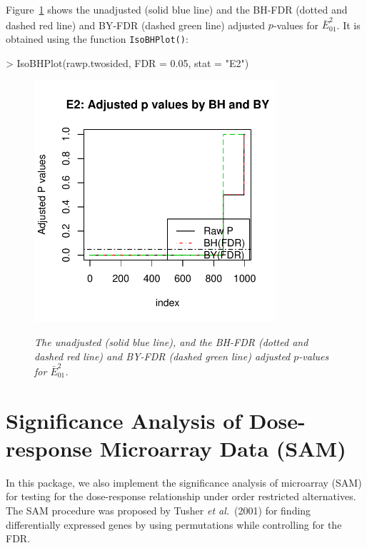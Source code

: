 \documentclass[10pt]{mybook4}
\begin{document}
Figure~\ref{IsoBHPlot} shows the unadjusted (solid blue line) and
the BH-FDR (dotted and dashed red line) and BY-FDR (dashed green
line) adjusted $p$-values for $\bar{E}^2_{01}$. It is obtained using
the function \texttt{IsoBHPlot()}:

\begin{Schunk}
\begin{Sinput}
> IsoBHPlot(rawp.twosided, FDR = 0.05, stat = "E2")
\end{Sinput}
\end{Schunk}


 
\begin{figure}[!h]
\centering
{\includegraphics[width=0.8\textwidth]{IsoGene-IsoBHPlot.pdf}}
\caption{\em {The unadjusted (solid blue line), and the BH-FDR
(dotted and dashed red line) and BY-FDR (dashed green line) adjusted
$p$-values for $\bar{E}_{01}^2$.}} \label{IsoBHPlot}
\end{figure}



\section{Significance Analysis of Dose-response Microarray Data (SAM)}

In this package, we also implement the significance analysis of microarray (SAM) for testing
for the dose-response relationship under order restricted alternatives. The SAM procedure was proposed
by Tusher \textit{et al.}\ (2001) for finding differentially expressed genes by using permutations while controlling for
the FDR.
\end{document}
